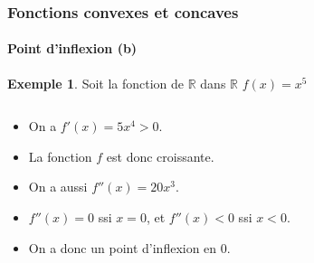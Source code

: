\documentclass[10pt,notheorems]{beamer}
\theoremstyle{plain}
\theoremstyle{definition} %
\newtheorem{example}{Exemple}
\begin{document}
\begin{frame}
  \frametitle{Fonctions convexes et concaves}
  \framesubtitle{Point d'inflexion (b)}
  \hypertarget{slide_fonctions_convexes_12}{}

  \begin{example}
    Soit la fonction de $\mathbb R$ dans $\mathbb R$ $f(x) = x^5$

    \begin{columns}[onlytextwidth]
      \begin{column}{.5\textwidth}
        \begin{itemize}
        \item On a $f'(x) = 5x^4>0$.\newline
        \item La fonction $f$ est donc croissante.\newline
        \item On a aussi $f''(x) = 20x^3$.\newline
        \item $f''(x) = 0$ ssi $x=0$, et $f''(x)<0$ ssi $x<0$.\newline
        \item On a donc un point d'inflexion en 0.
        \end{itemize}
      \end{column}
      \begin{column}{.5\textwidth}
        \begin{center}
        \end{center}
      \end{column}
    \end{columns}
  \end{example}

\end{frame}
\end{document}
